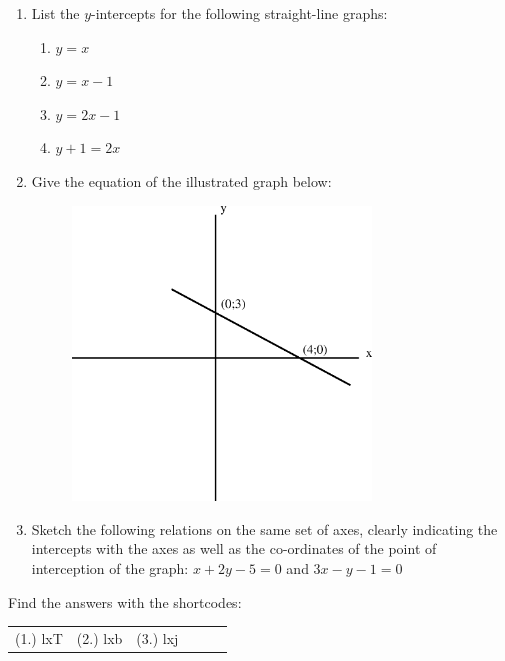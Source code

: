 \begin{exercises}{ }
{
\nopagebreak
\begin{enumerate}[noitemsep, label=\textbf{\arabic*}. ] 
\item List the $y$-intercepts for the following straight-line graphs:
    \begin{enumerate}[noitemsep, label=\textbf{\alph*}. ] 
    \item $y=x$
    \item $y=x-1$
    \item $y=2x-1$
    \item $y+1=2x$
    \end{enumerate}
\item Give the equation of the illustrated graph below:
\setcounter{subfigure}{0}
\begin{figure}[H] %
\begin{center}
\label{m39338*id240155!!!underscore!!!media}\label{m39338*id240155!!!underscore!!!printimage}\includegraphics[width=300px]{col11306.imgs/m39338_MG10C11_012.png} %
\vspace{2pt}
\vspace{.1in}
\end{center}
\end{figure}               

\item Sketch the following relations on the same set of axes, clearly indicating the intercepts with the axes as well as the co-ordinates of the point of interception of the graph:
$x+2y-5=0$ and $3x-y-1=0$\newline
\end{enumerate}

\par {} Find the answers with the shortcodes:
\par \begin{tabular}[h]{cccccc}
(1.) lxT  &  (2.) lxb  &  (3.) lxj  & \end{tabular}
}
\end{exercises}
